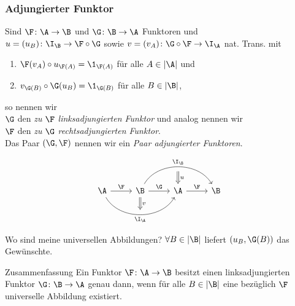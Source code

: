 \begin{frame}[fragile]
  \frametitle{Adjungierter Funktor}

\pause
  \begin{defn*}
  Sind $\F \colon \A \to \B$ und $\G \colon \B \to \A$ Funktoren und \\
    $u = (u_B) \colon \I_\B \to \F \circ \G$ sowie $v = (v_A) \colon \G \circ \F \to \I_\A$ nat. Trans. mit 
  \begin{enumerate}[(1)]
    \item $\F(v_A) \circ u_{\F(A)} = \1_{\F(A)}$ für alle $A \in |\A|$ und
    \item $v_{\G(B)} \circ \G(u_B) = \1_{\G(B)}$ für alle $B \in |\B|$,
  \end{enumerate}
  so nennen wir\\
    $\G$ den \emph{zu $\F$ linksadjungierten Funktor} und analog nennen wir \\
    $\F$ den \emph{zu $\G$ rechtsadjungierten Funktor}.\\
  Das Paar $(\G, \F)$ nennen wir ein \emph{Paar adjungierter Funktoren}.
\end{defn*}

    \pause
    $$
    \begin{tikzcd}[column sep=2.5em,row sep=1.5em]
      & & \ \arrow[d,"u",Rightarrow] & \\  
      \A \arrow[r,"\F"]\arrow[rr,"\I_\A"',bend right=60 ] & \B \arrow[r,"\G"] \arrow[rr,"\I_\B", bend left=60] \arrow[d,"v",Rightarrow] & \A \arrow[r,"\F"] & \B \\
      & \  &  &
    \end{tikzcd}
    $$
\end{frame}

\begin{frame}

  \begin{block}{Wo sind meine universellen Abbildungen?}
    \pause
    $\forall B \in |\B|$ liefert $(u_B, \G(B))$ das Gew\"unschte.
  \end{block}

\pause

  \begin{block}{Zusammenfassung}
    Ein Funktor $\F \colon \A \to \B$ besitzt einen linksadjungierten Funktor $\G \colon \B \to \A$ genau dann, wenn für alle $B \in |\B|$ eine bezüglich $\F$ universelle Abbildung existiert.
  \end{block}

\end{frame}


